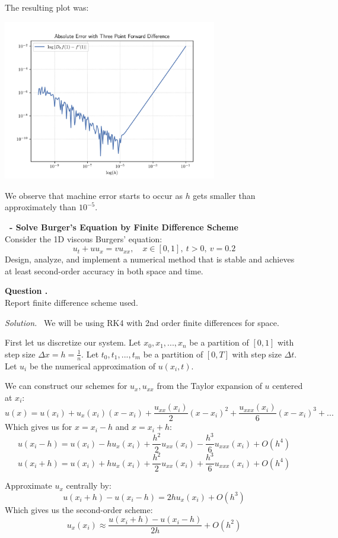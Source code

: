 \documentclass[12pt]{article}
\newcounter{question}
\newcounter{subquest}
\newcommand{\question}[1]{
    \stepcounter{question} 
    \vspace{1em}
    \textbf{\Large\thequestion \ - #1}
    \vspace{.5em} 
    \setcounter{subquest}{0}\ \\}
\newcommand{\subquestion}{
    \stepcounter{subquest} 
    \vspace{.5em}
    \textbf{\large Question \thequestion.\thesubquest}
    \vspace{.25em}\ \\}
\newcommand{\solution}
    {\par\vspace{0.5em}\noindent\emph{Solution.}\ }
    {\par\vspace{1em}}
\begin{document}
The resulting plot was:
\begin{center}
\includegraphics[width=0.7\textwidth]{../outputs_3/three_point_forward_diff_graph.png}
\end{center}

We observe that machine error starts to occur as $h$ gets smaller than approximately than $10^{-5}$.

\newpage

\question{Solve Burger's Equation by Finite Difference Scheme}
Consider the 1D viscous Burgers' equation:
\[u_t+uu_x=vu_{xx},\quad x\in[0,1], \ t>0, \ v=0.2\]
Design, analyze, and implement a numerical method that 
is stable and achieves at least second-order accuracy 
in both space and time.

\subquestion
Report finite difference scheme used.

\solution
We will be using RK4 with 2nd order finite differences for space.

First let us discretize our system. Let ${x_0, x_1, ..., x_n}$ be a partition of $[0,1]$ with step size $\Delta x =h=\frac{1}{n}$. Let $t_0, t_1, ..., t_m$ be a partition of $[0, T]$ with step size $\Delta t$. Let $u_i$ be the numerical approximation of $u(x_i, t)$.

We can construct our schemes for $u_x, u_{xx}$ from the Taylor expansion of $u$ centered at $x_i$:
\[u(x) = u(x_i) +u_x(x_i)(x-x_i) + \frac{u_{xx}(x_i)}{2}(x-x_i)^2 + \frac{u_{xxx}(x_i)}{6}(x-x_i)^3 + ...\]
Which gives us for $x=x_i - h$ and $x=x_i + h$:
\[u(x_i-h) = u(x_i) - hu_x(x_i) + \frac{h^2}{2}u_{xx}(x_i) - \frac{h^3}{6}u_{xxx}(x_i) + O(h^4)\]
\[u(x_i+h) = u(x_i) + hu_x(x_i) + \frac{h^2}{2}u_{xx}(x_i) + \frac{h^3}{6}u_{xxx}(x_i) + O(h^4)\]

Approximate $u_x$ centrally by:
\[u(x_i+h)-u(x_i-h) = 2hu_x(x_i) + O(h^3)\]
Which gives us the second-order scheme:
\[u_x(x_i) \approx \frac{u(x_i+h) - u(x_i - h)}{2h} + O(h^2)\]
\end{document}
